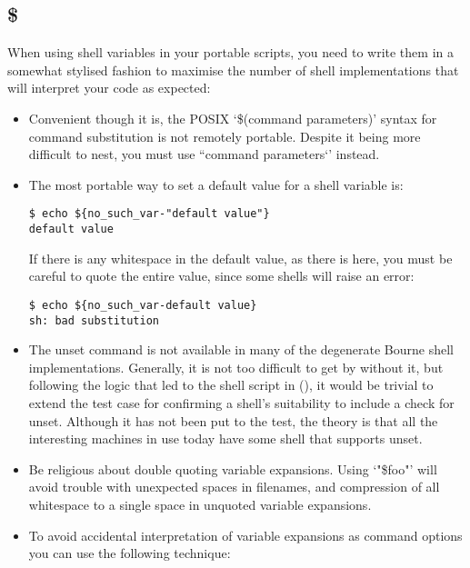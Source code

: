 \subsection{\$}

When using shell variables in your portable scripts, you need to write them in a somewhat stylised fashion to maximise the number of shell implementations that will interpret your code as expected: 

\begin{itemize}
\item Convenient though it is, the POSIX `\$(command parameters)' syntax for 
command substitution is not remotely portable. Despite it being more difficult 
to nest, you must use ``command parameters`' instead.

\item The most portable way to set a default value for a shell variable is:

\begin{Verbatim}[frame=single]
$ echo ${no_such_var-"default value"}
default value
\end{Verbatim}

If there is any whitespace in the default value, as there is here, you must be careful to quote the entire value, since some shells will raise an error:

\begin{Verbatim}[frame=single]
$ echo ${no_such_var-default value}
sh: bad substitution
\end{Verbatim}

\item The unset command is not available in many of the degenerate Bourne shell implementations. Generally, it is not too difficult to get by without it, but following the logic that led to the shell script in (), it would be trivial to extend the test case for confirming a shell's suitability to include a check for unset. Although it has not been put to the test, the theory is that all the interesting machines in use today have some shell that supports unset.

\item Be religious about double quoting variable expansions. Using `"\$foo"' will avoid trouble with unexpected spaces in filenames, and compression of all whitespace to a single space in unquoted variable expansions.

\item To avoid accidental interpretation of variable expansions as command options you can use the following technique:


\end{itemize}
